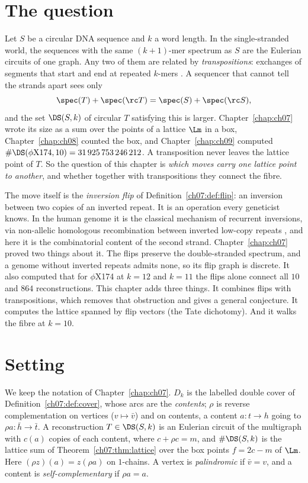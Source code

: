 \section{The question}\label{ch11:sec:question}

Let $S$ be a circular DNA sequence and $k$ a word length. In the single-stranded world, the sequences
with the same $(k+1)$-mer spectrum as $S$ are the Eulerian circuits of one graph. Any two of them are
related by \emph{transpositions}: exchanges of segments that start and end at repeated $k$-mers
\cite{Ukk92,Pev95}. A sequencer that cannot tell the strands apart sees only
\[
\spec(T)+\spec(\rc T)=\spec(S)+\spec(\rc S),
\]
and the set $\DS(S,k)$ of circular $T$ satisfying this is larger. Chapter~\ref{chap:ch07} wrote its size as a sum over the
points of a lattice $\Lm$ in a box, Chapter~\ref{chap:ch08} counted the box, and Chapter~\ref{chap:ch09} computed
$\#\DS(\phi\mathrm X174,10)=31\,925\,753\,246\,212$. A transposition never
leaves the lattice point of $T$. So the question of this chapter is \emph{which moves carry one lattice point
to another}, and whether together with transpositions they connect the fibre.

The move itself is the \emph{inversion flip} of Definition~\ref{ch07:def:flip}: an inversion between two copies of an
inverted repeat. It is an operation every geneticist knows. In the human genome it is the classical
mechanism of recurrent inversions, via non-allelic homologous recombination between inverted low-copy
repeats \cite{SL02}, and here it is the combinatorial content of the second strand. Chapter~\ref{chap:ch07} proved two
things about it. The flips preserve the double-stranded spectrum, and a genome without inverted repeats
admits none, so its flip graph is discrete. It also computed that for $\phi$X174 at $k=12$ and $k=11$ the
flips alone connect all $10$ and $864$ reconstructions. This chapter adds three things. It combines flips
with transpositions, which removes that obstruction and gives a general conjecture. It computes the
lattice spanned by flip vectors (the Tate dichotomy). And it walks the fibre at $k=10$.

\section{Setting}\label{ch11:sec:setting}

We keep the notation of Chapter~\ref{chap:ch07}. $D_k$ is the labelled double cover of
Definition~\ref{ch07:def:cover}, whose arcs are the \emph{contents}; $\rho$ is reverse
complementation on vertices ($v\mapsto\bar v$) and on contents, a content $a\colon t\to h$ going to
$\rho a\colon\bar h\to\bar t$. A reconstruction $T\in\DS(S,k)$ is an Eulerian circuit of the multigraph
with $c(a)$ copies of each content, where $c+\rho c=m$, and $\#\DS(S,k)$ is the lattice sum of
Theorem~\ref{ch07:thm:lattice} over the box points $f=2c-m$ of $\Lm$. Here $(\rho z)(a)=z(\rho a)$ on $1$-chains. A vertex is \emph{palindromic} if $\bar v=v$, and
a content is \emph{self-complementary} if $\rho a=a$.

